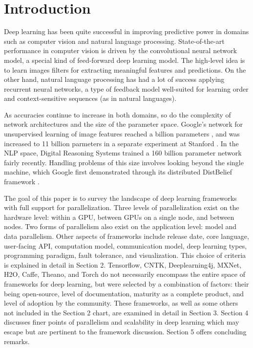 \section{Introduction}
Deep learning has been quite successful in improving predictive power in domains such as computer vision and natural language processing. State-of-the-art performance in computer vision is driven by the convolutional neural network model, a special kind of feed-forward deep learning model. The high-level idea is to learn images filters for extracting meaningful features and predictions. On the other hand, natural language processing has had a lot of success applying recurrent neural networks, a type of feedback model well-suited for learning order and context-sensitive sequences (as in natural languages). 

As accuracies continue to increase in both domains, so do the complexity of network architectures and the size of the parameter space. Google's network for unsupervised learning of image features reached a billion parameters \cite{donahue2014decaf}, and was increased to 11 billion parmeters in a separate experiment at Stanford \cite{schmidhuber2015deep}. In the NLP space, Digital Reasoning Systems trained a 160 billion parameter network \cite{trask2015modeling} fairly recently. Handling problems of this size involves looking beyond the single machine, which Google first demonstrated through its distributed DistBelief framework \cite{dean2012large}.

The goal of this paper is to survey the landscape of deep learning frameworks with full support for parallelization. Three levels of parallelization exist on the hardware level: within a GPU, between GPUs on a single node, and between nodes. Two forms of parallelism also exist on the application level: model and data parallelism. Other aspects of frameworks include release date, core language, user-facing API, computation model, communication model, deep learning types, programming paradigm, fault tolerance, and visualization. This choice of criteria is explained in detail in Section 2. Tensorflow, CNTK, Deeplearning4j, MXNet, H2O, Caffe, Theano, and Torch do not necessarily encompass the entire space of frameworks for deep learning, but were selected by a combination of factors: their being open-source, level of documentation, maturity as a complete product, and level of adoption by the community. These frameworks, as well as some others not included in the Section 2 chart, are examined in detail in Section 3. Section 4 discusses finer points of parallelism and scalability in deep learning which may escape but are pertinent to the framework discussion. Section 5 offers concluding remarks.